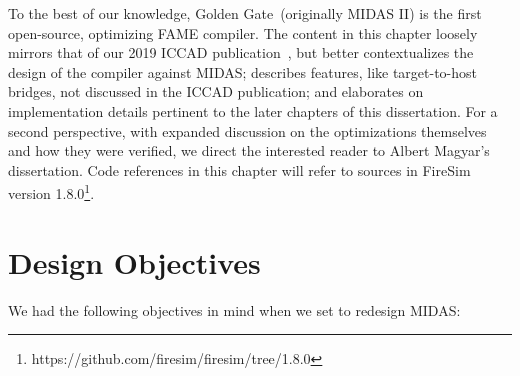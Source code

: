 To the best of our knowledge, Golden Gate~(originally MIDAS II) is the first
open-source, optimizing FAME compiler. The content in this chapter loosely
mirrors that of our 2019 ICCAD publication~\cite{GoldenGate}, but better
contextualizes the design of the compiler against MIDAS; describes features,
like target-to-host bridges, not discussed in the ICCAD publication; and
elaborates on implementation details pertinent to the later chapters of this
dissertation.  For a second perspective, with expanded discussion on the
optimizations themselves and how they were verified, we direct the interested
reader to Albert Magyar's dissertation. Code references in this chapter will
refer to sources in FireSim version
1.8.0\footnote{https://github.com/firesim/firesim/tree/1.8.0}.

\section{Design Objectives}

We had the following objectives in mind when we set to redesign MIDAS:

